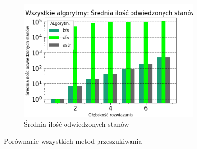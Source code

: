 \documentclass{classrep}
\begin{document}
\begin{figure}[H]
\begin{subfigure}[t]{0.45\textwidth}
        \includegraphics[width=\textwidth]{charts/ALL_visited.png}
        \caption{Średnia ilość odwiedzonych stanów}
        \label{ALL:visited}
    \end{subfigure}
    \caption{Porównanie wszystkich metod przeszukiwania}\label{col:all}
\end{figure}
\end{document}
